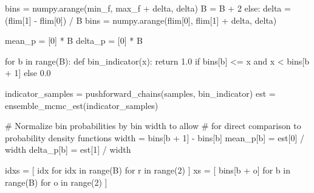 \documentclass[
  letterpaper,
  DIV=11,
  numbers=noendperiod]{scrartcl}
\newenvironment{Shaded}{\begin{snugshade}}{\end{snugshade}}
\newcommand{\BuiltInTok}[1]{\textcolor[rgb]{0.00,0.23,0.31}{#1}}
\newcommand{\CommentTok}[1]{\textcolor[rgb]{0.37,0.37,0.37}{#1}}
\newcommand{\ControlFlowTok}[1]{\textcolor[rgb]{0.00,0.23,0.31}{#1}}
\newcommand{\DecValTok}[1]{\textcolor[rgb]{0.68,0.00,0.00}{#1}}
\newcommand{\FloatTok}[1]{\textcolor[rgb]{0.68,0.00,0.00}{#1}}
\newcommand{\KeywordTok}[1]{\textcolor[rgb]{0.00,0.23,0.31}{#1}}
\newcommand{\NormalTok}[1]{\textcolor[rgb]{0.00,0.23,0.31}{#1}}
\newcommand{\OperatorTok}[1]{\textcolor[rgb]{0.37,0.37,0.37}{#1}}
\begin{document}
\begin{Shaded}
\begin{Highlighting}[]
\NormalTok{    bins }\OperatorTok{=}\NormalTok{ numpy.arange(min\_f, max\_f }\OperatorTok{+}\NormalTok{ delta, delta)}
\NormalTok{    B }\OperatorTok{=}\NormalTok{ B }\OperatorTok{+} \DecValTok{2}
  \ControlFlowTok{else}\NormalTok{:}
\NormalTok{    delta }\OperatorTok{=}\NormalTok{ (flim[}\DecValTok{1}\NormalTok{] }\OperatorTok{{-}}\NormalTok{ flim[}\DecValTok{0}\NormalTok{]) }\OperatorTok{/}\NormalTok{ B}
\NormalTok{    bins }\OperatorTok{=}\NormalTok{ numpy.arange(flim[}\DecValTok{0}\NormalTok{], flim[}\DecValTok{1}\NormalTok{] }\OperatorTok{+}\NormalTok{ delta, delta)}
  
\NormalTok{  mean\_p }\OperatorTok{=}\NormalTok{ [}\DecValTok{0}\NormalTok{] }\OperatorTok{*}\NormalTok{ B}
\NormalTok{  delta\_p }\OperatorTok{=}\NormalTok{ [}\DecValTok{0}\NormalTok{] }\OperatorTok{*}\NormalTok{ B}
  
  \ControlFlowTok{for}\NormalTok{ b }\KeywordTok{in} \BuiltInTok{range}\NormalTok{(B):}
    \KeywordTok{def}\NormalTok{ bin\_indicator(x):}
      \ControlFlowTok{return} \FloatTok{1.0} \ControlFlowTok{if}\NormalTok{ bins[b] }\OperatorTok{\textless{}=}\NormalTok{ x }\KeywordTok{and}\NormalTok{ x }\OperatorTok{\textless{}}\NormalTok{ bins[b }\OperatorTok{+} \DecValTok{1}\NormalTok{] }\ControlFlowTok{else} \FloatTok{0.0}
    
\NormalTok{    indicator\_samples }\OperatorTok{=}\NormalTok{ pushforward\_chains(samples, bin\_indicator)}
\NormalTok{    est }\OperatorTok{=}\NormalTok{ ensemble\_mcmc\_est(indicator\_samples)}
    
    \CommentTok{\# Normalize bin probabilities by bin width to allow}
    \CommentTok{\# for direct comparison to probability density functions}
\NormalTok{    width }\OperatorTok{=}\NormalTok{ bins[b }\OperatorTok{+} \DecValTok{1}\NormalTok{] }\OperatorTok{{-}}\NormalTok{ bins[b]}
\NormalTok{    mean\_p[b] }\OperatorTok{=}\NormalTok{ est[}\DecValTok{0}\NormalTok{] }\OperatorTok{/}\NormalTok{ width}
\NormalTok{    delta\_p[b] }\OperatorTok{=}\NormalTok{ est[}\DecValTok{1}\NormalTok{] }\OperatorTok{/}\NormalTok{ width}
  
\NormalTok{  idxs }\OperatorTok{=}\NormalTok{ [ idx }\ControlFlowTok{for}\NormalTok{ idx }\KeywordTok{in} \BuiltInTok{range}\NormalTok{(B) }\ControlFlowTok{for}\NormalTok{ r }\KeywordTok{in} \BuiltInTok{range}\NormalTok{(}\DecValTok{2}\NormalTok{) ]}
\NormalTok{  xs }\OperatorTok{=}\NormalTok{ [ bins[b }\OperatorTok{+}\NormalTok{ o] }\ControlFlowTok{for}\NormalTok{ b }\KeywordTok{in} \BuiltInTok{range}\NormalTok{(B) }\ControlFlowTok{for}\NormalTok{ o }\KeywordTok{in} \BuiltInTok{range}\NormalTok{(}\DecValTok{2}\NormalTok{) ]}
  

\end{Highlighting}
\end{Shaded}
\end{document}
